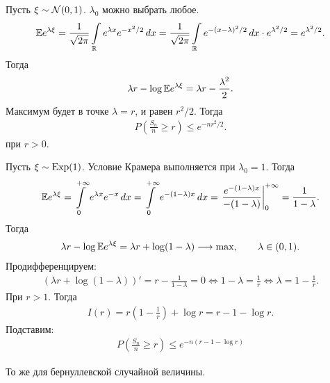 \documentclass[../main.tex]{subfiles}
\begin{document}
\begin{exmpl}
 Пусть $ \xi \sim \mathcal N(0, 1) $. $ \lambda_0 $ можно выбрать любое.
  \begin{align*}
  \mathbb E e^{\lambda \xi} = \frac{1}{\sqrt{2\pi}} \int\limits_{\mathbb{R}} e^{\lambda x}  e^{-x^{2} / 2}\,dx = \frac{1}{\sqrt{2\pi}} \int\limits_{\mathbb{R}} e^{-(x-\lambda)^{2} / 2}\,dx \cdot e^{\lambda^{2} / 2} = e^{\lambda^{2} / 2}.
 \end{align*} Тогда
 \begin{align*}
  \lambda r - \log \mathbb E e^{\lambda \xi}  = \lambda r - \frac{\lambda^{2}}{2}.
 \end{align*} Максимум будет в точке $ \lambda = r $, и равен  $ r^{2}  / 2$. Тогда
 \begin{align*}
  P \left( \frac{S_n}{n} \geqslant r \right) \leqslant e^{-nr^{2} / 2}.
 \end{align*} при $ r > 0 $.
\end{exmpl}
\begin{exmpl}
 Пусть $ \xi \sim \mathrm{Exp}(1) $. Условие Крамера выполняется при  $ \lambda_0 = 1 $. Тогда
  \begin{align*}
  \mathbb E e^{\lambda \xi} = \int\limits_{0}^{+\infty} e^{\lambda x}e^{-x}\,dx = \int\limits_{0}^{+\infty} e^{-(1 - \lambda)x}\,dx = \left. \frac{e^{-(1-\lambda)x}}{-(1-\lambda)} \right|_0^{+\infty} = \frac{1}{1 - \lambda}.
 \end{align*} Тогда
 \begin{align*}
  \lambda r - \log \mathbb E e^{\lambda \xi} = \lambda r + \log (1 - \lambda) \longrightarrow \max, \qquad \lambda \in (0, 1).
 \end{align*} Продифференцируем:
 \begin{align*}
  (\lambda r + \log(1 - \lambda))' = r - \frac{1}{1 - \lambda} = 0 \iff 1 - \lambda = \frac{1}{r} \iff \lambda = 1 - \frac{1}{r}.
 \end{align*} При $ r > 1 $. Тогда
  \begin{align*}
  I(r) = r\left(1 - \frac{1}{r}\right) + \log r = r - 1 - \log r.
 \end{align*} Подставим:
 \begin{align*}
  P \left( \frac{S_n}{n} \geqslant r \right) \leqslant e^{-n(r - 1 - \log r)}
 \end{align*}
\end{exmpl}

\begin{exercs*}
 То же для бернуллевской случайной величины.
\end{exercs*}
\end{document}
